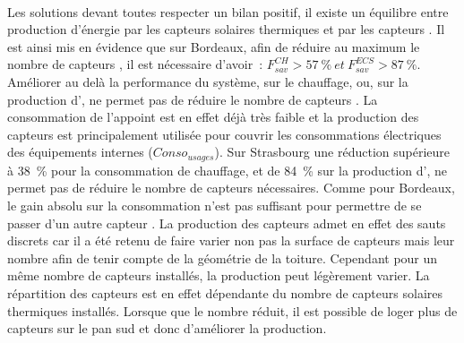 \paragraph{} %
Les solutions devant toutes respecter un bilan positif, il existe un équilibre entre
production d’énergie par les capteurs solaires thermiques et par les capteurs .
Il est ainsi mis en évidence que sur Bordeaux, afin de réduire au maximum le nombre
de capteurs , il est nécessaire d’avoir~:
$F_{sav}^{CH} > \SI{57}{\percent} \ et \ F_{sav}^{ECS} > \SI{87}{\percent}$.
Améliorer au delà la performance du système, sur le chauffage, ou, sur la production
d’, ne permet pas de réduire le nombre de capteurs . La consommation de
l’appoint est en effet déjà très faible et la production des capteurs  est
principalement utilisée pour couvrir les consommations électriques des équipements
internes ($Conso_{usages}$). Sur Strasbourg une réduction supérieure à \SI{38}{\percent}
pour la consommation de chauffage, et de \SI{84}{\percent} sur la production d’,
ne permet pas de réduire le nombre de capteurs  nécessaires. Comme pour Bordeaux,
le gain absolu sur la consommation n’est pas suffisant pour permettre de se passer d’un
autre capteur . La production des capteurs  admet en effet des sauts
discrets car il a été retenu de faire varier non pas la surface de capteurs mais leur
nombre afin de tenir compte de la géométrie de la toiture.
Cependant pour un même nombre de capteurs installés, la production peut légèrement varier. La
répartition des capteurs  est en effet dépendante du nombre de capteurs solaires
thermiques installés. Lorsque que le nombre réduit, il est possible de loger plus de
capteurs  sur le pan sud et donc d’améliorer la production.


